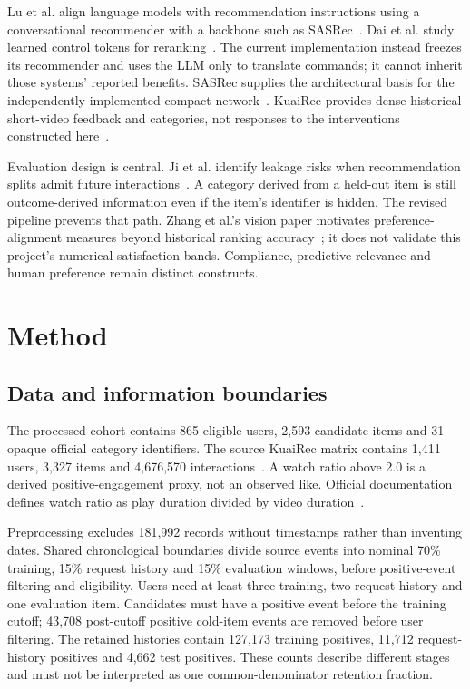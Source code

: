 \documentclass[conference]{IEEEtran}
\begin{document}
Lu et al. align language models with recommendation instructions using a conversational recommender with a backbone such as SASRec~\cite{lu2024aligning}. Dai et al. study learned control tokens for reranking~\cite{dai2025token}. The current implementation instead freezes its recommender and uses the LLM only to translate commands; it cannot inherit those systems' reported benefits. SASRec supplies the architectural basis for the independently implemented compact network~\cite{kang2018sasrec}. KuaiRec provides dense historical short-video feedback and categories, not responses to the interventions constructed here~\cite{gao2022kuairec}.

Evaluation design is central. Ji et al. identify leakage risks when recommendation splits admit future interactions~\cite{ji2023leakage}. A category derived from a held-out item is still outcome-derived information even if the item's identifier is hidden. The revised pipeline prevents that path. Zhang et al.'s vision paper motivates preference-alignment measures beyond historical ranking accuracy~\cite{zhang2026context}; it does not validate this project's numerical satisfaction bands. Compliance, predictive relevance and human preference remain distinct constructs.

\section{Method}
\subsection{Data and information boundaries}
The processed cohort contains 865 eligible users, 2,593 candidate items and 31 opaque official category identifiers. The source KuaiRec matrix contains 1,411 users, 3,327 items and 4,676,570 interactions~\cite{gao2022kuairec}. A watch ratio above 2.0 is a derived positive-engagement proxy, not an observed like. Official documentation defines watch ratio as play duration divided by video duration~\cite{kuairecdocs}.

Preprocessing excludes 181,992 records without timestamps rather than inventing dates. Shared chronological boundaries divide source events into nominal 70\% training, 15\% request history and 15\% evaluation windows, before positive-event filtering and eligibility. Users need at least three training, two request-history and one evaluation item. Candidates must have a positive event before the training cutoff; 43,708 post-cutoff positive cold-item events are removed before user filtering. The retained histories contain 127,173 training positives, 11,712 request-history positives and 4,662 test positives. These counts describe different stages and must not be interpreted as one common-denominator retention fraction.
\end{document}

